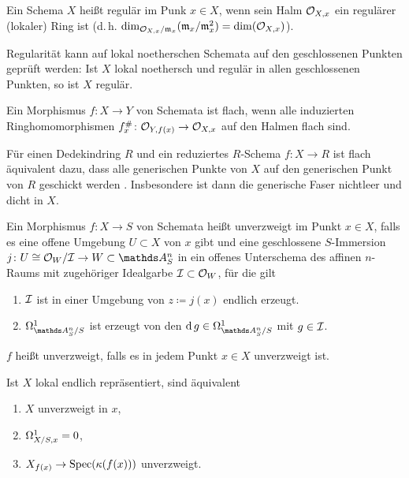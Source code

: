 \documentclass[german]{scrreprt}
\begin{document}
\begin{Definition}[Regulär]
  Ein Schema $X$ heißt regulär im Punk $x\in X$, wenn sein Halm
  $\mathcal{O}_{X,x}$ ein regulärer (lokaler) Ring ist
  (d.\,h. $\dim_{\mathcal{O}_{X,x}/\mathfrak{m}_x}(\mathfrak{m}_x/\mathfrak{m}_x^2)=\dim(\mathcal{O}_{X,x})$).

  Regularität kann auf lokal noetherschen Schemata auf den geschlossenen
  Punkten geprüft werden:
  Ist $X$ lokal noethersch und regulär in allen geschlossenen Punkten,
  so ist $X$ regulär.
  \cite[Remark 6.25 (3)]{wedhorn}
\end{Definition}


\begin{Definition}
  Ein Morphismus $f\colon X\to Y$ von Schemata ist flach, wenn alle
  induzierten Ringhomomorphismen $f_x^\#\colon \mathcal{O}_{Y,f(x)}\to\mathcal{O}_{X,x}$  auf
  den Halmen flach sind.
  \cite[]{bosch, goodreduction}
\end{Definition}
\begin{Bemerkung}\label{thm:flachgenerischefaser}
  Für einen Dedekindring $R$ und ein reduziertes $R$-Schema $f\colon
  X\to R$ ist flach äquivalent dazu, dass alle generischen Punkte von 
  $X$ auf den generischen Punkt von $R$ geschickt werden
  \cite[Proposition III.9.7]{hartshorne}.
  Insbesondere ist dann die generische Faser nichtleer und dicht in $X$.
\end{Bemerkung}


\begin{Definition}
  Ein Morphismus $f\colon X\to S$ von Schemata heißt unverzweigt im
  Punkt $x\in X$, falls es eine offene Umgebung
  $U\subset X$ von $x$ gibt und eine geschlossene $S$-Immersion
  $j\colon U\cong\O_W/\I\to W\subset\A_S^n$ in ein offenes Unterschema
  des affinen $n$-Raums mit zugehöriger Idealgarbe $\mathcal{I}\subset\mathcal{O}_W$,
  für die gilt
  \begin{enumerate}[label=(\alph*)]
  \item $\mathcal{I}$ ist in einer Umgebung von $z\coloneqq j(x)$ endlich erzeugt.
  \item $\Om{\A_S^n/S}$ ist erzeugt von den $\d g\in\Om{\A_S^n/S}$
    mit $g\in\mathcal{I}$.
  \end{enumerate}
  $f$ heißt unverzweigt, falls es in jedem Punkt $x\in X$
  unverzweigt ist.
  \begin{Bemerkung}
    Ist $X$ lokal endlich repräsentiert, sind äquivalent
    \begin{enumerate}[label=(\roman*)]
    \item $X$ unverzweigt in $x$,
    \item $\Omega_{X/S,x}^1=0$,
    \item $X_{f(x)}\to \operatorname{Spec}(\kappa(f(x)))$ unverzweigt.
    \end{enumerate}
    \cite[8.4, Theorem 3]{bosch}
  \end{Bemerkung}
\end{Definition}
\end{document}
